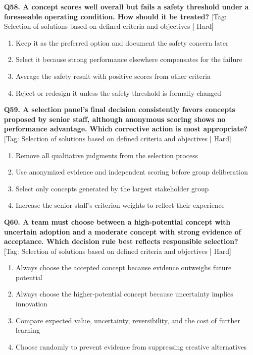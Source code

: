 \noindent\textbf{Q58. A concept scores well overall but fails a safety threshold under a foreseeable operating condition. How should it be treated?} \hfill [Tag: Selection of solutions based on defined criteria and objectives | Hard]
\begin{enumerate}[label=(\alph*),topsep=2pt,itemsep=1pt,partopsep=0pt,parsep=0pt]
    \item {Keep it as the preferred option and document the safety concern later}
    \item {Select it because strong performance elsewhere compensates for the failure}
    \item {Average the safety result with positive scores from other criteria}
    \item {Reject or redesign it unless the safety threshold is formally changed}
\end{enumerate}
\vspace{2mm}

\noindent\textbf{Q59. A selection panel's final decision consistently favors concepts proposed by senior staff, although anonymous scoring shows no performance advantage. Which corrective action is most appropriate?} \hfill [Tag: Selection of solutions based on defined criteria and objectives | Hard]
\begin{enumerate}[label=(\alph*),topsep=2pt,itemsep=1pt,partopsep=0pt,parsep=0pt]
    \item {Remove all qualitative judgments from the selection process}
    \item {Use anonymized evidence and independent scoring before group deliberation}
    \item {Select only concepts generated by the largest stakeholder group}
    \item {Increase the senior staff's criterion weights to reflect their experience}
\end{enumerate}
\vspace{2mm}

\noindent\textbf{Q60. A team must choose between a high-potential concept with uncertain adoption and a moderate concept with strong evidence of acceptance. Which decision rule best reflects responsible selection?} \hfill [Tag: Selection of solutions based on defined criteria and objectives | Hard]
\begin{enumerate}[label=(\alph*),topsep=2pt,itemsep=1pt,partopsep=0pt,parsep=0pt]
    \item {Always choose the accepted concept because evidence outweighs future potential}
    \item {Always choose the higher-potential concept because uncertainty implies innovation}
    \item {Compare expected value, uncertainty, reversibility, and the cost of further learning}
    \item {Choose randomly to prevent evidence from suppressing creative alternatives}
\end{enumerate}
\vspace{2mm}


